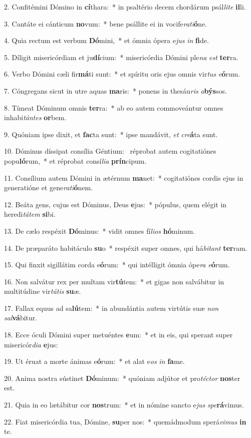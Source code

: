2. Confitémini Dómino in \textbf{cí}thara:~*  in psaltério decem chordárum psál\textit{li}\textit{te} \textbf{il}li.\

3. Cantáte ei cánticum \textbf{no}vum:~*  bene psállite ei in vocife\textit{ra}\textit{ti}\textbf{ó}ne.\

4. Quia rectum est verbum \textbf{Dó}mini,~*  et ómnia ópera e\textit{jus} \textit{in} \textbf{fi}de.\

5. Díligit misericórdiam et ju\textbf{dí}cium:~*  misericórdia Dómini ple\textit{na} \textit{est} \textbf{ter}ra.\

6. Verbo Dómini cæli fir\textbf{má}ti sunt:~*  et spíritu oris ejus omnis vir\textit{tus} \textit{e}\textbf{ó}rum.\

7. Cóngregans sicut in utre aquas \textbf{ma}ris:~*  ponens in thesáu\textit{ris} \textit{a}\textbf{býs}sos.\

8. Tímeat Dóminum omnis \textbf{ter}ra:~*  ab eo autem commoveántur omnes inhabi\textit{tán}\textit{tes} \textbf{or}bem.\

9. Quóniam ipse dixit, et \textbf{fac}ta sunt:~*  ipse mandávit, \textit{et} \textit{cre}\textbf{á}ta sunt.\

10. Dóminus díssipat consília Géntium: \dag\  réprobat autem cogitatiónes popu\textbf{ló}rum,~*  et réprobat consí\textit{li}\textit{a} \textbf{prín}cipum.\

11. Consílium autem Dómini in ætérnum \textbf{ma}net:~*  cogitatiónes cordis ejus in generatióne et gene\textit{ra}\textit{ti}\textbf{ó}nem.\

12. Beáta gens, cujus est Dóminus, Deus \textbf{e}jus:~*  pópulus, quem elégit in heredi\textit{tá}\textit{tem} \textbf{si}bi.\

13. De cælo respéxit \textbf{Dó}minus:~*  vidit omnes fí\textit{li}\textit{os} \textbf{hó}minum.\

14. De præparáto habitáculo \textbf{su}o~*  respéxit super omnes, qui há\textit{bi}\textit{tant} \textbf{ter}ram.\

15. Qui finxit sigillátim corda e\textbf{ó}rum:~*  qui intélligit ómnia ópe\textit{ra} \textit{e}\textbf{ó}rum.\

16. Non salvátur rex per multam vir\textbf{tú}tem:~*  et gigas non salvábitur in multitúdine vir\textit{tú}\textit{tis} \textbf{su}æ.\

17. Fallax equus ad sa\textbf{lú}tem:~*  in abundántia autem virtútis suæ \textit{non} \textit{sal}\textbf{vá}bitur.\

18. Ecce óculi Dómini super metuéntes \textbf{e}um:~*  et in eis, qui sperant super misericór\textit{di}\textit{a} \textbf{e}jus:\

19. Ut éruat a morte ánimas e\textbf{ó}rum:~*  et alat e\textit{os} \textit{in} \textbf{fa}me.\

20. Anima nostra sústinet \textbf{Dó}minum:~*  quóniam adjútor et pro\textit{téc}\textit{tor} \textbf{nos}ter est.\

21. Quia in eo lætábitur cor \textbf{nos}trum:~*  et in nómine sancto e\textit{jus} \textit{spe}\textbf{rá}vimus.\

22. Fiat misericórdia tua, Dómine, \textbf{su}per nos:~*  quemádmodum sperá\textit{vi}\textit{mus} \textbf{in} te.\

